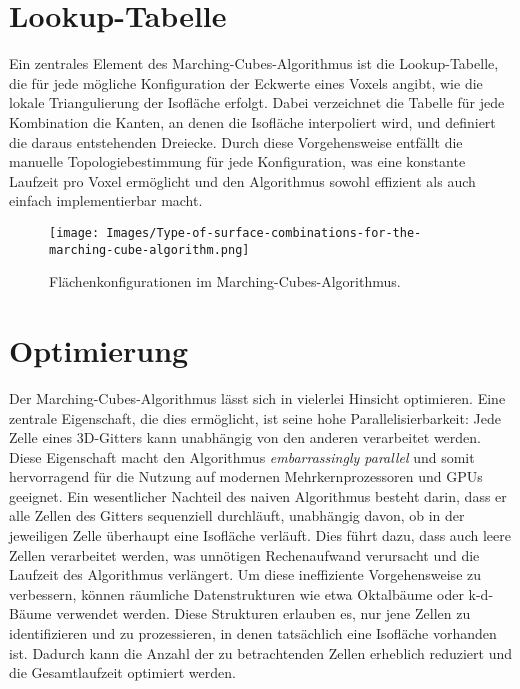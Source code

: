 \documentclass[12pt]{article}
\begin{document}
\section{Lookup-Tabelle}
Ein zentrales Element des Marching-Cubes-Algorithmus ist die Lookup-Tabelle, die für jede mögliche Konfiguration der Eckwerte eines Voxels angibt, wie die lokale Triangulierung der Isofläche erfolgt.
Dabei verzeichnet die Tabelle für jede Kombination die Kanten, an denen die Isofläche interpoliert wird, und definiert die daraus entstehenden Dreiecke.
Durch diese Vorgehensweise entfällt die manuelle Topologiebestimmung für jede Konfiguration,
was eine konstante Laufzeit pro Voxel ermöglicht und den Algorithmus sowohl effizient als auch einfach implementierbar macht.
\begin{figure}[ht]
    \centering
    \texttt{[image: Images/Type-of-surface-combinations-for-the-marching-cube-algorithm.png]}
    \caption{Flächenkonfigurationen im Marching-Cubes-Algorithmus.}
    \label{fig:surface-combinations}
\end{figure}
\section{Optimierung}
Der Marching-Cubes-Algorithmus lässt sich in vielerlei Hinsicht optimieren.
Eine zentrale Eigenschaft, die dies ermöglicht, ist seine hohe Parallelisierbarkeit: Jede Zelle eines 3D-Gitters kann unabhängig von den anderen verarbeitet werden.
Diese Eigenschaft macht den Algorithmus \emph{embarrassingly parallel} und somit hervorragend für die Nutzung auf modernen Mehrkernprozessoren und GPUs geeignet.
Ein wesentlicher Nachteil des naiven Algorithmus besteht darin, dass er alle Zellen des Gitters sequenziell durchläuft,
unabhängig davon, ob in der jeweiligen Zelle überhaupt eine Isofläche verläuft.
Dies führt dazu, dass auch leere Zellen verarbeitet werden, was unnötigen Rechenaufwand verursacht und die Laufzeit des Algorithmus verlängert.
Um diese ineffiziente Vorgehensweise zu verbessern, können räumliche Datenstrukturen wie etwa Oktalbäume oder k-d-Bäume verwendet werden.
Diese Strukturen erlauben es, nur jene Zellen zu identifizieren und zu prozessieren, in denen tatsächlich eine Isofläche vorhanden ist.
Dadurch kann die Anzahl der zu betrachtenden Zellen erheblich reduziert und die Gesamtlaufzeit optimiert werden.
\newpage
\end{document}
